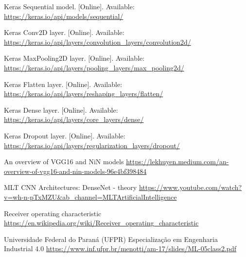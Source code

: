 \documentclass[conference]{IEEEtran}
\begin{document}
\begin{thebibliography}{10}
Keras Sequential model. [Online]. Available: \url{https://keras.io/api/models/sequential/}

Keras Conv2D layer. [Online]. Available: \url{https://keras.io/api/layers/convolution_layers/convolution2d/}

Keras MaxPooling2D layer. [Online]. Available: \url{https://keras.io/api/layers/pooling_layers/max_pooling2d/}

Keras Flatten layer. [Online]. Available: \url{https://keras.io/api/layers/reshaping_layers/flatten/}

Keras Dense layer. [Online]. Available: \url{https://keras.io/api/layers/core_layers/dense/}

Keras Dropout layer. [Online]. Available: \url{https://keras.io/api/layers/regularization_layers/dropout/}

An overview of VGG16 and NiN models
\url{https://lekhuyen.medium.com/an-overview-of-vgg16-and-nin-models-96e4bf398484}

MLT CNN Architectures: DenseNet - theory
\url{https://www.youtube.com/watch?v=wh-n-pTxMZU&ab_channel=MLTArtificialIntelligence}

Receiver operating characteristic
\url{https://en.wikipedia.org/wiki/Receiver_operating_characteristic}

Universidade Federal do Paraná (UFPR)
Especialização em Engenharia Industrial 4.0
\url{https://www.inf.ufpr.br/menotti/am-17/slides/ML-05class2.pdf}

\end{thebibliography}
\end{document}
